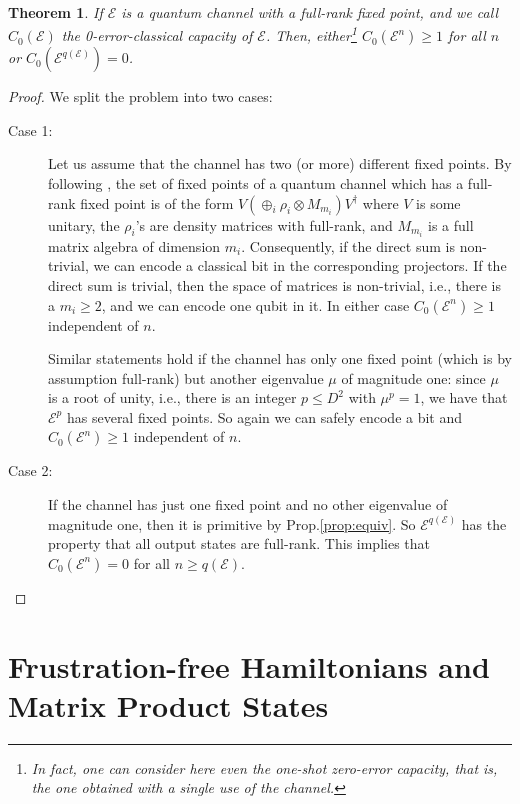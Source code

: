 \documentclass[journal,twoside]{IEEEtran}
\newtheorem{theorem}{Theorem}
\newcommand{\1}{\mathbbm{1}}
\def\E{{\cal E}}
\renewcommand{\>}{\rangle}
\newcommand{\<}{\langle}
\def\E{\mathcal{E}}
\begin{document}
\begin{theorem}\label{thm:zero}
If $\E$ is a quantum channel with a full-rank fixed point, and we
call $C_0(\E)$ the 0-error-classical capacity of $\E$. Then,
either\footnote{In fact, one can consider here even the one-shot zero-error
capacity, that is, the one obtained with a single use of the channel.} $C_0(\E^n)\ge 1$ for all $n$ or $C_0(\E^{q(\E)})=0$.
\end{theorem}
\begin{proof}
We split the problem into two cases:
\begin{description}
  \item[Case 1: ] \mbox{}\par
Let us assume that the channel has two (or more) different fixed
points. By following \cite{Lindblad}, the set of fixed points of
a quantum channel which has a full-rank fixed point is of the
form $V\left(\oplus_i \rho_{i}\otimes{M_{m_i}} \right)V^\dagger$
where $V$ is some unitary, the $\rho_i$'s are density matrices
with full-rank, and ${M_{m_i}}$ is a full matrix algebra of
dimension $m_i$. Consequently, if the direct sum is non-trivial,
we can encode a classical bit in the corresponding projectors.
If the direct sum is trivial, then the space of matrices is
non-trivial, i.e., there is a $m_i\geq 2$, and we can encode one
qubit in it. In either case $C_0(\E^n)\ge 1$ independent of $n$.

Similar statements hold if the channel has only one fixed point
(which is by assumption full-rank) but another eigenvalue $\mu$
of magnitude one: since $\mu$ is a root of unity, i.e., there is
an integer $p\leq D^2$ with $\mu^p=1$, we have that $\E^p$ has
several fixed points. So again we can safely encode a bit and
$C_0(\E^n)\ge 1$ independent of $n$.
  \item[Case 2: ] \mbox{}\par
If the channel has just one fixed point and no other eigenvalue
of magnitude one, then it is primitive by Prop.\ref{prop:equiv}.
So $\E^{q(\E)}$ has the property that all output states are
full-rank. This implies \cite{Cubitt} that $C_0(\E^{n})=0$ for
all $n\geq q(\E)$.
\end{description}
\end{proof}


\section{Frustration-free Hamiltonians and Matrix Product
States}
\end{document}

